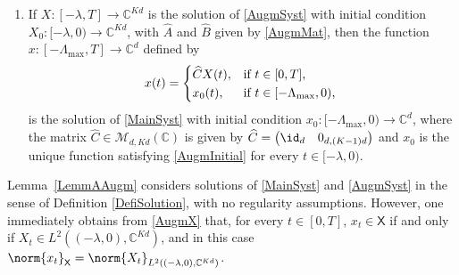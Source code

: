 \begin{lemm}
\begin{enumerate}
\begin{equation}
\begin{aligned}
&\hspace*{2cm}\text{(in particular, $\widehat A_k = 0$ if $k_j \neq k$ for all $j \in \llbracket 1, N\rrbracket$)},
\end{aligned}
\end{equation}
and with initial condition $X_0: [-\lambda, 0) \to \mathbb C^{K d}$ given by
\begin{equation}
\label{AugmInitial}
X_0(t) = \begin{pmatrix}
x_0(t) \\
x_0(t - \lambda) \\
x_0(t - 2\lambda) \\
\vdots \\
x_0(t - (K-1)\lambda) \\
\end{pmatrix}.
\end{equation}

\item If $X: [-\lambda, T] \to \mathbb C^{K d}$ is the solution of \eqref{AugmSyst} with initial condition $X_0: [-\lambda, 0) \to \mathbb C^{K d}$, with $\widehat A$ and $\widehat B$ given by \eqref{AugmMat}, then the function $x: [-\Lambda_{\max}, T] \to \mathbb C^d$ defined by
\[
x(t) =
\begin{dcases*}
\widehat C X(t), & if $t \in [0, T]$, \\
x_0(t), & if $t \in [-\Lambda_{\max}, 0)$,
\end{dcases*}
\]
is the solution of \eqref{MainSyst} with initial condition $x_0: [-\Lambda_{\max}, 0) \to \mathbb C^d$, where the matrix $\widehat C \in \mathcal M_{d, K d}(\mathbb C)$ is given by $\widehat C = \begin{pmatrix}\id_d & 0_{d, (K-1)d}\end{pmatrix}$ and $x_0$ is the unique function satisfying \eqref{AugmInitial} for every $t \in [-\lambda, 0)$.
\end{enumerate}
\end{lemm}

\begin{remk}
Lemma~\ref{LemmAAugm} considers solutions of \eqref{MainSyst} and \eqref{AugmSyst} in the sense of Definition \ref{DefiSolution}, \ie with no regularity assumptions. However, one immediately obtains from \eqref{AugmX} that, for every $t \in [0, T]$, $x_t \in \mathsf X$ if and only if $X_t \in L^2((-\lambda, 0), \mathbb C^{Kd})$, and in this case $\norm{x_t}_{\mathsf X} = \norm{X_t}_{L^2((-\lambda, 0), \mathbb C^{Kd})}$.
\end{remk}

